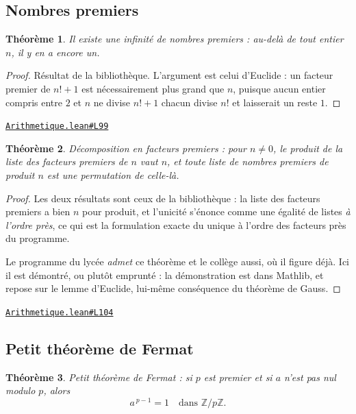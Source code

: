 \documentclass[11pt,a4paper]{article}
\theoremstyle{definition}
\theoremstyle{plain}
\newtheorem{theoreme}{Théorème}
\newcommand{\source}[2]{\par\smallskip\noindent\hfill{\footnotesize\href{#1}{\texttt{#2}}}\par\smallskip}
\begin{document}
\subsection{Nombres premiers}

\begin{theoreme}
Il existe une infinité de nombres premiers : au-delà de tout entier $n$, il y en a encore
un.
\end{theoreme}

\begin{proof}
Résultat de la bibliothèque. L'argument est celui d'Euclide : un facteur premier de
$n! + 1$ est nécessairement plus grand que $n$, puisque aucun entier compris entre $2$ et
$n$ ne divise $n! + 1$ \textemdash{} chacun divise $n!$ et laisserait un reste $1$.
\end{proof}
\source{https://github.com/Commutator-IO/learn-lean/blob/main/cours/02-lycee/10-specialite-mathematiques-terminale-s/Arithmetique.lean\#L99}{Arithmetique.lean\#L99}

\begin{theoreme}
Décomposition en facteurs premiers : pour $n \ne 0$, le produit de la liste des facteurs
premiers de $n$ vaut $n$, et toute liste de nombres premiers de produit $n$ est une
permutation de celle-là.
\end{theoreme}

\begin{proof}
Les deux résultats sont ceux de la bibliothèque : la liste des facteurs premiers a bien
$n$ pour produit, et l'unicité s'énonce comme une égalité de listes \emph{à l'ordre près},
ce qui est la formulation exacte du \og{} unique à l'ordre des facteurs près \fg{} du
programme.

\medskip\noindent
Le programme du lycée \emph{admet} ce théorème \textemdash{} et le collège aussi, où il
figure déjà. Ici il est démontré, ou plutôt emprunté : la démonstration est dans Mathlib,
et repose sur le lemme d'Euclide, lui-même conséquence du théorème de Gauss.
\end{proof}
\source{https://github.com/Commutator-IO/learn-lean/blob/main/cours/02-lycee/10-specialite-mathematiques-terminale-s/Arithmetique.lean\#L104}{Arithmetique.lean\#L104}

\subsection{Petit théorème de Fermat}

\begin{theoreme}
Petit théorème de Fermat : si $p$ est premier et si $a$ n'est pas nul modulo $p$, alors
\[ a^{\,p-1} = 1 \quad \text{dans } \mathbb{Z}/p\mathbb{Z} . \]
\end{theoreme}
\end{document}
